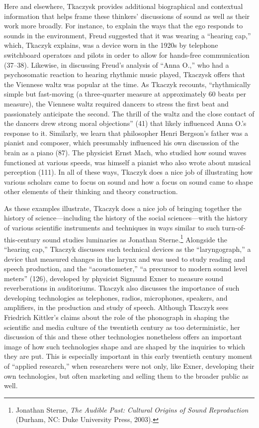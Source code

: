 \documentclass{tufte-handout}
\begin{document}
Here and elsewhere, Tkaczysk provides additional biographical and
contextual information that helps frame these thinkers' discussions of
sound as well as their work more broadly. For instance, to explain the
ways that the ego responds to sounds in the environment, Freud suggested
that it was wearing a ``hearing cap,'' which, Tkaczyk explains, was a
device worn in the 1920s by telephone switchboard operators and pilots
in order to allow for hands-free communication (37--38). Likewise, in
discussing Freud's analysis of ``Anna O.,'' who had a psychosomatic
reaction to hearing rhythmic music played, Tkaczysk offers that the
Viennese waltz was popular at the time. As Tkaczyk recounts,
``rhythmically simple but fast-moving (a three-quarter measure at
approximately 60 beats per measure), the Viennese waltz required dancers
to stress the first beat and passionately anticipate the second. The
thrill of the waltz and the close contact of the dancers drew strong
moral objections'' (41) that likely influenced Anna O.'s response to it.
Similarly, we learn that philosopher Henri Bergson's father was a
pianist and composer, which presumably influenced his own discussion of
the brain as a piano (87). The physicist Ernst Mach, who studied how
sound waves functioned at various speeds, was himself a pianist who also
wrote about musical perception (111). In all of these ways, Tkaczyk does
a nice job of illustrating how various scholars came to focus on sound
and how a focus on sound came to shape other elements of their thinking
and theory construction.

As these examples illustrate, Tkaczyk does a nice job of bringing
together the history of science---including the history of the social
sciences---with the history of various scientific instruments and
techniques in ways similar to such turn-of-this-century sound studies
luminaries as Jonathan Sterne.\footnote{Jonathan Sterne, \emph{The
  Audible Past: Cultural Origins of Sound Reproduction} (Durham, NC:
  Duke University Press, 2003).} Alongside the ``hearing cap,'' Tkaczyk
discusses such technical devices as the ``laryngograph,'' a device that
measured changes in the larynx and was used to study reading and speech
production, and the ``acoustometer,'' ``a precursor to modern sound
level meters'' (126), developed by physicist Sigmund Exner to measure
sound reverberations in auditoriums. Tkaczyk also discusses the
importance of such developing technologies as telephones, radios,
microphones, speakers, and amplifiers, in the production and study of
speech. Although Tkaczyk sees Friedrich Kittler's claims about the role
of the phonograph in shaping the scientific and media culture of the
twentieth century as too deterministic, her discussion of this and these
other technologies nonetheless offers an important image of how such
technologies shape and are shaped by the inquiries to which they are
put. This is especially important in this early twentieth century moment
of ``applied research,'' when researchers were not only, like Exner,
developing their own technologies, but often marketing and selling them
to the broader public as well.
\end{document}
